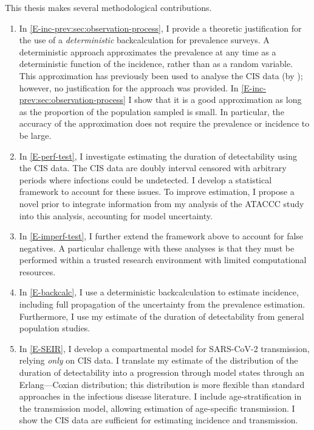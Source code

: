 \documentclass[thesis.tex]{subfiles}
\begin{document}
This thesis makes several methodological contributions.
\begin{enumerate}
    \item In \cref{E-inc-prev:sec:observation-process}, I provide a theoretic justification for the use of a \emph{deterministic} backcalculation for prevalence surveys.
    A deterministic approach approximates the prevalence at any time as a deterministic function of the incidence, rather than as a random variable.
    This approximation has previously been used to analyse the CIS data (\eg by \textcite{abbottCISincidence}); however, no justification for the approach was provided.
    In \cref{E-inc-prev:sec:observation-process} I show that it is a good approximation as long as the proportion of the population sampled is small.
    In particular, the accuracy of the approximation does not require the prevalence or incidence to be large.
    
    \item In \cref{E-perf-test}, I investigate estimating the duration of detectability using the CIS data.
    The CIS data are doubly interval censored with arbitrary periods where infections could be undetected.
    I develop a statistical framework to account for these issues.
    To improve estimation, I propose a novel prior to integrate information from my analysis of the ATACCC study into this analysis, accounting for model uncertainty.
    
    \item In \cref{E-imperf-test}, I further extend the framework above to account for false negatives.
    A particular challenge with these analyses is that they must be performed within a trusted research environment with limited computational resources.

    \item In \cref{E-backcalc}, I use a deterministic backcalculation to estimate incidence, including full propagation of the uncertainty from the prevalence estimation.
    Furthermore, I use my estimate of the duration of detectability from general population studies.
    
    \item In \cref{E-SEIR}, I develop a compartmental model for SARS-CoV-2 transmission, relying \emph{only} on CIS data. 
    I translate my estimate of the distribution of the duration of detectability into a progression through model states through an Erlang---Coxian distribution; this distribution is more flexible than standard approaches in the infectious disease literature.
    I include age-stratification in the transmission model, allowing estimation of age-specific transmission.
    I show the CIS data are sufficient for estimating incidence and transmission.
\end{enumerate}
\end{document}
